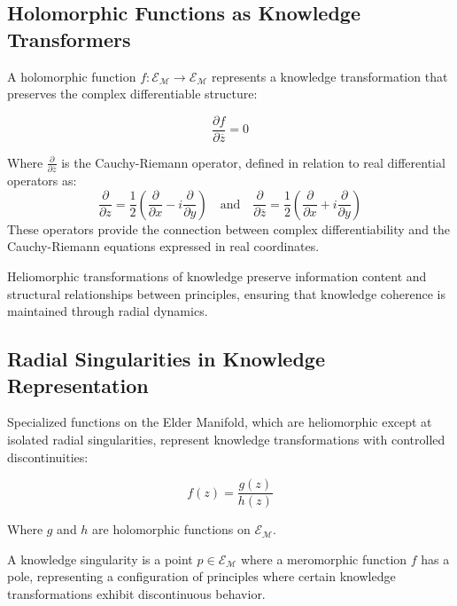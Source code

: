 \subsection{Holomorphic Functions as Knowledge Transformers}

A holomorphic function $f: \mathcal{E}_{\mathcal{M}} \rightarrow \mathcal{E}_{\mathcal{M}}$ represents a knowledge transformation that preserves the complex differentiable structure:

\begin{equation}
\frac{\partial f}{\partial \overline{z}} = 0
\end{equation}

Where $\frac{\partial}{\partial \overline{z}}$ is the Cauchy-Riemann operator, defined in relation to real differential operators as:
\begin{equation}
\frac{\partial}{\partial z} = \frac{1}{2}\left(\frac{\partial}{\partial x} - i\frac{\partial}{\partial y}\right) \quad \text{and} \quad \frac{\partial}{\partial \overline{z}} = \frac{1}{2}\left(\frac{\partial}{\partial x} + i\frac{\partial}{\partial y}\right)
\end{equation}
These operators provide the connection between complex differentiability and the Cauchy-Riemann equations expressed in real coordinates.

\begin{theorem}
Heliomorphic transformations of knowledge preserve information content and structural relationships between principles, ensuring that knowledge coherence is maintained through radial dynamics.
\end{theorem}

\subsection{Radial Singularities in Knowledge Representation}

Specialized functions on the Elder Manifold, which are heliomorphic except at isolated radial singularities, represent knowledge transformations with controlled discontinuities:

\begin{equation}
f(z) = \frac{g(z)}{h(z)}
\end{equation}

Where $g$ and $h$ are holomorphic functions on $\mathcal{E}_{\mathcal{M}}$.

\begin{definition}
A knowledge singularity is a point $p \in \mathcal{E}_{\mathcal{M}}$ where a meromorphic function $f$ has a pole, representing a configuration of principles where certain knowledge transformations exhibit discontinuous behavior.
\end{definition}

